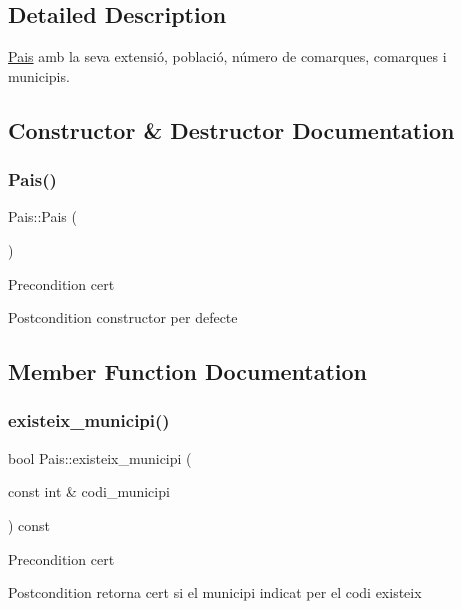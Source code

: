 \subsection{Detailed Description}
\hyperlink{classPais}{Pais} amb la seva extensió, població, número de comarques, comarques i municipis. 

\subsection{Constructor \& Destructor Documentation}
\mbox{\label{classPais_a16af2b45eb9d07e7292a58556edc9371}} 
\subsubsection{\texorpdfstring{Pais()}{Pais()}}
{\footnotesize\ttfamily Pais\+::\+Pais (\begin{DoxyParamCaption}{ }\end{DoxyParamCaption})}

\begin{DoxyPrecond}{Precondition}
cert 
\end{DoxyPrecond}
\begin{DoxyPostcond}{Postcondition}
constructor per defecte 
\end{DoxyPostcond}


\subsection{Member Function Documentation}
\mbox{\label{classPais_a45b3d49b3b3ff239c18d535c48c77697}} 
\subsubsection{\texorpdfstring{existeix\+\_\+municipi()}{existeix\_municipi()}}
{\footnotesize\ttfamily bool Pais\+::existeix\+\_\+municipi (\begin{DoxyParamCaption}\item[{const int \&}]{codi\+\_\+municipi }\end{DoxyParamCaption}) const}

\begin{DoxyPrecond}{Precondition}
cert 
\end{DoxyPrecond}
\begin{DoxyPostcond}{Postcondition}
retorna cert si el municipi indicat per el codi existeix 
\end{DoxyPostcond}
\mbox{\label{classPais_af6b3159f78cd255468f513178760dd1f}} 
